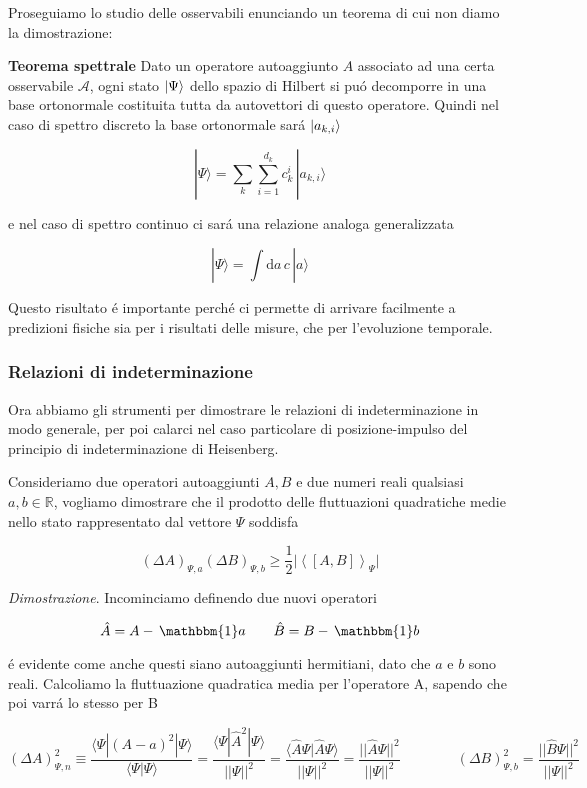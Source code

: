 Proseguiamo lo studio delle osservabili enunciando un teorema di cui non diamo la dimostrazione:

\begin{theorem} \textbf{Teorema spettrale}
	Dato un operatore autoaggiunto $A$ associato ad una certa osservabile $\mathcal{A}$, ogni stato $\normalsize| \Psi \normalsize\rangle$ dello spazio di Hilbert si pu\'o decomporre in una base ortonormale costituita tutta da autovettori di questo operatore. Quindi nel caso di spettro discreto la base ortonormale sar\'a $\normalsize| a_{k,i} \normalsize\rangle$
	
	$$|\Psi\rangle=\sum_{k}\sum_{i=1}^{d_{k}}c_{k}^{i}\,|a_{k,i}\rangle$$
	
	e nel caso di spettro continuo ci sar\'a una relazione analoga generalizzata
	
	$$|\Psi\rangle=\int\mathrm{d}a\,c\,|a\rangle$$
	
	Questo risultato \'e importante perch\'e ci permette di arrivare facilmente a predizioni fisiche sia per i risultati delle misure, che per l'evoluzione temporale.	
\end{theorem}


\subsubsection{Relazioni di indeterminazione}

Ora abbiamo gli strumenti per dimostrare le relazioni di indeterminazione in modo generale, per poi calarci nel caso particolare di posizione-impulso del principio di indeterminazione di Heisenberg.

Consideriamo due operatori autoaggiunti $A, B$ e due numeri reali qualsiasi $a, b \in \mathbb{R}$, vogliamo dimostrare che il prodotto delle fluttuazioni quadratiche medie nello stato rappresentato dal vettore $\Psi$ soddisfa

$$(\Delta A)_{\Psi,a}(\Delta B)_{\Psi,b}\geq\frac{1}{2}\vert\left<[A,B]\right>_{\Psi}\vert$$

\textit{Dimostrazione}. Incominciamo definendo due nuovi operatori

$$\hat{A}=A-\,\mathbbm{1}a\qquad\hat{B}=B-\,\mathbbm{1}b$$

\'e evidente come anche questi siano autoaggiunti hermitiani, dato che $a$ e $b$ sono reali. Calcoliamo la fluttuazione quadratica media per l'operatore A, sapendo che poi varr\'a lo stesso per B

$$(\Delta A)^{2}_{\Psi,n}\equiv\frac{\langle\Psi|(A-a)^{2}|\Psi\rangle}{\langle\Psi|\Psi\rangle}=\frac{\langle\Psi|\hat{A}^{2}|\Psi\rangle}{||\Psi||^{2}}=\frac{\langle\hat{A}\Psi|\hat{A}\Psi\rangle}{||\Psi||^{2}}=\frac{||\hat{A}\Psi||^{2}}{||\Psi||^{2}}\qquad\qquad(\Delta B)^{2}_{\Psi,b}=\frac{||\hat{B}\Psi||^{2}}{||\Psi||^{2}}$$ 

